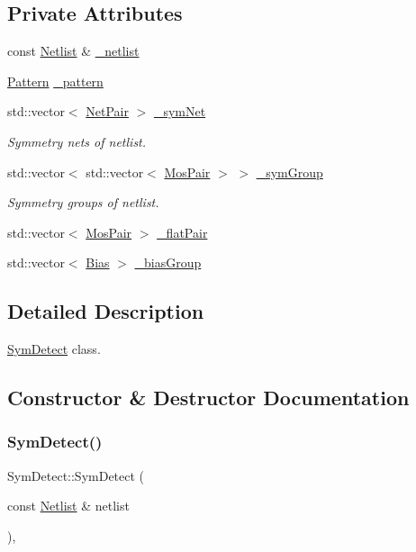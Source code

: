 \subsection*{Private Attributes}
\begin{DoxyCompactItemize}
\item 
const \hyperlink{classNetlist}{Netlist} \& \hyperlink{classSymDetect_aaa007c5c446ad65879c91e258542c9f3}{\+\_\+netlist}
\item 
\hyperlink{classPattern}{Pattern} \hyperlink{classSymDetect_a77937a3591871874553ea30e7d78fc2e}{\+\_\+pattern}
\item 
std\+::vector$<$ \hyperlink{classNetPair}{Net\+Pair} $>$ \hyperlink{classSymDetect_a09a99c8eef474364f9fe2e27603ea686}{\+\_\+sym\+Net}
\begin{DoxyCompactList}\small\item\em Symmetry nets of netlist. \end{DoxyCompactList}\item 
std\+::vector$<$ std\+::vector$<$ \hyperlink{classMosPair}{Mos\+Pair} $>$ $>$ \hyperlink{classSymDetect_a40ce15f1c812ec3d3338d82cbbffb029}{\+\_\+sym\+Group}
\begin{DoxyCompactList}\small\item\em Symmetry groups of netlist. \end{DoxyCompactList}\item 
std\+::vector$<$ \hyperlink{classMosPair}{Mos\+Pair} $>$ \hyperlink{classSymDetect_acc727357719b1e8c5fbb03007dc88ce9}{\+\_\+flat\+Pair}
\item 
std\+::vector$<$ \hyperlink{classBias}{Bias} $>$ \hyperlink{classSymDetect_ad6b079274a3c6ec5b1e275c14e319ab6}{\+\_\+bias\+Group}
\end{DoxyCompactItemize}


\subsection{Detailed Description}
\hyperlink{classSymDetect}{Sym\+Detect} class. 

\subsection{Constructor \& Destructor Documentation}
\mbox{\label{classSymDetect_aaf0ca6563b2168db22cfd313ec773c23}} 
\subsubsection{\texorpdfstring{Sym\+Detect()}{SymDetect()}}
{\footnotesize\ttfamily Sym\+Detect\+::\+Sym\+Detect (\begin{DoxyParamCaption}\item[{const \hyperlink{classNetlist}{Netlist} \&}]{netlist }\end{DoxyParamCaption})\hspace{0.3cm}{\ttfamily [inline]}, {\ttfamily [explicit]}}



